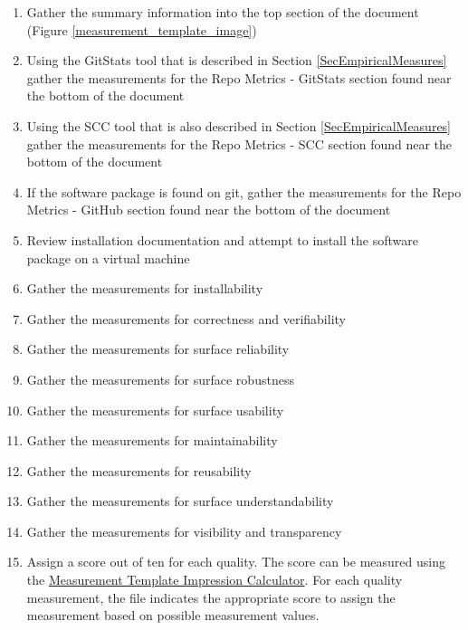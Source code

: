 \documentclass[letterpaper,cleveref]{lipics-v2019}
\theoremstyle{definition}
\begin{document}
\begin{enumerate} 
	\item Gather the summary information into the top section of the document (Figure \ref{measurement_template_image})
	\item Using the GitStats tool that is described in Section \ref{SecEmpiricalMeasures} gather the measurements for the Repo Metrics - GitStats section found near the bottom of the document
	\item Using the SCC tool that is also described in Section \ref{SecEmpiricalMeasures} gather the measurements for the Repo Metrics - SCC section found near the bottom of the document
	\item If the software package is found on git, gather the measurements for the Repo Metrics - GitHub section found near the bottom of the document
	\item Review installation documentation and attempt to install the software package on a virtual machine
	\item Gather the measurements for installability
	\item Gather the measurements for correctness and verifiability
	\item Gather the measurements for surface reliability
	\item Gather the measurements for surface robustness
	\item Gather the measurements for surface usability
	\item Gather the measurements for maintainability
	\item Gather the measurements for reusability
	\item Gather the measurements for surface understandability
	\item Gather the measurements for visibility and transparency
	\item Assign a score out of ten for each quality. The score can be measured using the \href{run:MeasurementTemplate_ImpressionCalculator.xlsx}{Measurement Template Impression Calculator}. For each quality measurement, the file indicates the appropriate score to assign the measurement based on possible measurement values.
\end{enumerate}
\end{document}
